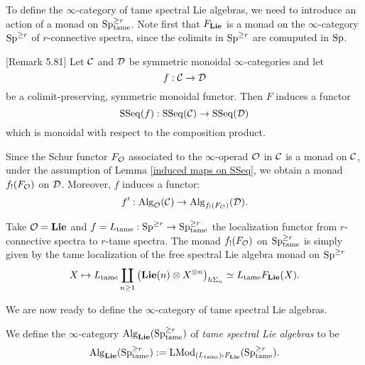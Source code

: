 To define the $\infty$-category of tame spectral Lie algebras, we need to introduce an action of a monad on $\operatorname{Sp}^{\geq r}_{\operatorname{tame}}$.
Note first that $F_{\mathbf{Lie}}$ is a monad on the $\infty$-category $\operatorname{Sp}^{\geq r}$ of $r$-connective spectra, since the colimits in $\operatorname{Sp}^{\geq r}$ are comuputed in $\operatorname{Sp}$.

\begin{lemma}
\label{induced maps on SSeq}
\cite{Hadrianphdthesis}[Remark 5.81]
Let ${\mathcal{C}}$ and ${\mathcal{D}}$ be symmetric monoidal $\infty$-categories and let 
$$
f: {\mathcal{C}} \to {\mathcal{D}}
$$
be a colimit-preserving, symmetric monoidal functor.
Then $F$ induces a functor 
$$
\operatorname{SSeq}(f): \operatorname{SSeq}({\mathcal{C}}) \to \operatorname{SSeq}({\mathcal{D}})
$$
which is monoidal with respect to the composition product.
\end{lemma}	


Since the Schur functor $F_{{\mathcal{O}}}$ associated to the $\infty$-operad ${\mathcal{O}}$ in ${\mathcal{C}}$ is a monad on ${\mathcal{C}}$, under the assumption of Lemma \ref{induced maps on SSeq}, we obtain a monad $f_{!}(F_{\mathcal{O}})$ on ${\mathcal{D}}$. Moreover, $f$ induces a functor:
\[
f' : \operatorname{Alg}_{{\mathcal{O}}}({\mathcal{C}}) \to \operatorname{Alg}_{f_{!}(F_{\mathcal{O}})}({\mathcal{D}}).
\]

Take ${\mathcal{O}}=\mathbf{Lie}$ and $f=L_{\operatorname{\operatorname{tame}}}:\operatorname{Sp}^{\geq r} \to \operatorname{Sp}^{\geq r}_{\operatorname{\operatorname{tame}}}$ the localization functor from $r$-connective spectra to $r$-tame spectra. The monad $f_{!}(F_{\mathcal{O}})$ on $\operatorname{Sp}^{\geq r}_{\operatorname{\operatorname{tame}}}$ is simply given by the tame localization of the free spectral Lie algebra monad on $\operatorname{Sp}^{\geq r}$
$$
X \mapsto  
L_{\operatorname{\operatorname{tame}}}
\coprod_{n\geq 1}
		\big(
		\mathbf{Lie}(n) \otimes X^{\otimes n}
		\big)_{h\Sigma_n}
		\simeq 
		L_{\operatorname{\operatorname{tame}}}F_{\mathbf{Lie}}(X).
$$

We are now ready to define the $\infty$-category of tame spectral Lie algebras.
\begin{definition}
\label{Def of tame spectral Lie algebras}
    We define the $\infty$-category $\operatorname{Alg}_{\mathbf{Lie}}(\operatorname{Sp}^{\geq r}_{\operatorname{\operatorname{tame}}})$ of \emph{tame spectral Lie algebras} to be 
    $$
    \operatorname{Alg}_{\mathbf{Lie}}(\operatorname{Sp}^{\geq r}_{\operatorname{\operatorname{tame}}}) := \operatorname{LMod}_{	(L_{\operatorname{\operatorname{tame}}})_{!}F_{\mathbf{Lie}}}(\operatorname{Sp}^{\geq r}_{\operatorname{\operatorname{tame}}}).
    $$
\end{definition}

